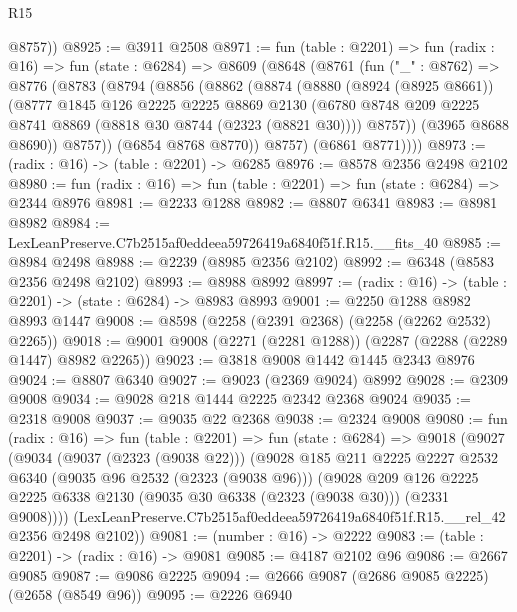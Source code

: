 \begin{lexlean}{R15}
\begin{coremodule}
        @8757))
@8925 := @3911 @2508
@8971 := fun (table : @2201) =>
  fun (radix : @16) =>
  fun (state : @6284) =>
  @8609
    (@8648
      (@8761
        (fun ("_" : @8762) =>
        @8776
          (@8783
            (@8794
              (@8856
                (@8862
                  (@8874
                    (@8880
                      (@8924 (@8925 @8661))
                      (@8777
                        @1845
                        @126
                        @2225
                        @2225
                        @8869
                        @2130
                        (@6780 @8748 @209 @2225 @8741 @8869 (@8818 @30 @8744 (@2323 (@8821 @30))))
                        @8757))
                    (@3965 @8688 @8690))
                  @8757))
              (@6854 @8768 @8770))
            @8757)
          (@6861 @8771))))
@8973 := (radix : @16) -> (table : @2201) -> @6285
@8976 := @8578 @2356 @2498 @2102
@8980 := fun (radix : @16) => fun (table : @2201) => fun (state : @6284) => @2344 @8976
@8981 := @2233 @1288
@8982 := @8807 @6341
@8983 := @8981 @8982
@8984 := LexLeanPreserve.C7b2515af0eddeea59726419a6840f51f.R15.__fits_40
@8985 := @8984 @2498
@8988 := @2239 (@8985 @2356 @2102)
@8992 := @6348 (@8583 @2356 @2498 @2102)
@8993 := @8988 @8992
@8997 := (radix : @16) -> (table : @2201) -> (state : @6284) -> @8983 @8993
@9001 := @2250 @1288 @8982 @8993 @1447
@9008 := @8598 (@2258 (@2391 @2368) (@2258 (@2262 @2532) @2265))
@9018 := @9001 @9008 (@2271 (@2281 @1288)) (@2287 (@2288 (@2289 @1447) @8982 @2265))
@9023 := @3818 @9008 @1442 @1445 @2343 @8976
@9024 := @8807 @6340
@9027 := @9023 (@2369 @9024) @8992
@9028 := @2309 @9008
@9034 := @9028 @218 @1444 @2225 @2342 @2368 @9024
@9035 := @2318 @9008
@9037 := @9035 @22 @2368
@9038 := @2324 @9008
@9080 := fun (radix : @16) =>
  fun (table : @2201) =>
  fun (state : @6284) =>
  @9018
    (@9027
      (@9034
        (@9037 (@2323 (@9038 @22)))
        (@9028
          @185
          @211
          @2225
          @2227
          @2532
          @6340
          (@9035 @96 @2532 (@2323 (@9038 @96)))
          (@9028
            @209
            @126
            @2225
            @2225
            @6338
            @2130
            (@9035 @30 @6338 (@2323 (@9038 @30)))
            (@2331 @9008))))
      (LexLeanPreserve.C7b2515af0eddeea59726419a6840f51f.R15.__rel_42 @2356 @2498 @2102))
@9081 := (number : @16) -> @2222
@9083 := (table : @2201) -> (radix : @16) -> @9081
@9085 := @4187 @2102 @96
@9086 := @2667 @9085
@9087 := @9086 @2225
@9094 := @2666 @9087 (@2686 @9085 @2225) (@2658 (@8549 @96))
@9095 := @2226 @6940

\end{coremodule}
\end{lexlean}
